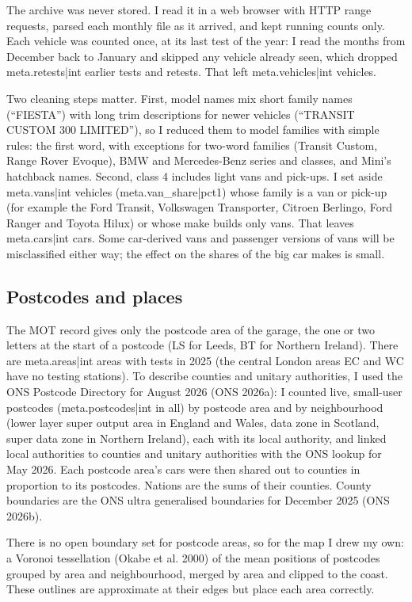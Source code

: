 \documentclass[11pt,a4paper]{article}
\begin{document}
The archive was never stored. I read it in a web browser with HTTP range requests, parsed each monthly file as it arrived, and kept running counts only. Each vehicle was counted once, at its last test of the year: I read the months from December back to January and skipped any vehicle already seen, which dropped {{meta.retests|int}} earlier tests and retests. That left {{meta.vehicles|int}} vehicles.

Two cleaning steps matter. First, model names mix short family names (``FIESTA'') with long trim descriptions for newer vehicles (``TRANSIT CUSTOM 300 LIMITED''), so I reduced them to model families with simple rules: the first word, with exceptions for two-word families (Transit Custom, Range Rover Evoque), BMW and Mercedes-Benz series and classes, and Mini's hatchback names. Second, class 4 includes light vans and pick-ups. I set aside {{meta.vans|int}} vehicles ({{meta.van_share|pct1}}) whose family is a van or pick-up (for example the Ford Transit, Volkswagen Transporter, Citroen Berlingo, Ford Ranger and Toyota Hilux) or whose make builds only vans. That leaves {{meta.cars|int}} cars. Some car-derived vans and passenger versions of vans will be misclassified either way; the effect on the shares of the big car makes is small.

\subsection{Postcodes and places}

The MOT record gives only the postcode area of the garage, the one or two letters at the start of a postcode (LS for Leeds, BT for Northern Ireland). There are {{meta.areas|int}} areas with tests in 2025 (the central London areas EC and WC have no testing stations). To describe counties and unitary authorities, I used the ONS Postcode Directory for August 2026 (ONS 2026a): I counted live, small-user postcodes ({{meta.postcodes|int}} in all) by postcode area and by neighbourhood (lower layer super output area in England and Wales, data zone in Scotland, super data zone in Northern Ireland), each with its local authority, and linked local authorities to counties and unitary authorities with the ONS lookup for May 2026. Each postcode area's cars were then shared out to counties in proportion to its postcodes. Nations are the sums of their counties. County boundaries are the ONS ultra generalised boundaries for December 2025 (ONS 2026b).

There is no open boundary set for postcode areas, so for the map I drew my own: a Voronoi tessellation (Okabe et al. 2000) of the mean positions of postcodes grouped by area and neighbourhood, merged by area and clipped to the coast. These outlines are approximate at their edges but place each area correctly.
\end{document}
